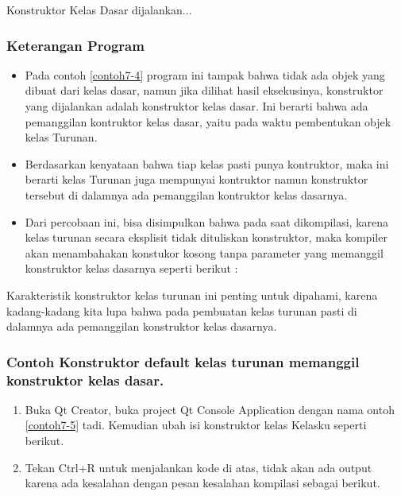 \begin{lcverbatim}
Konstruktor Kelas Dasar dijalankan...
\end{lcverbatim}


\subsubsection*{Keterangan Program}

\begin{itemize}
\item
 Pada contoh \ref{contoh7-4} program ini tampak bahwa tidak ada objek yang dibuat dari
 kelas dasar, namun jika dilihat hasil eksekusinya, konstruktor yang
 dijalankan adalah konstruktor kelas dasar. Ini berarti bahwa ada
 pemanggilan kontruktor kelas dasar, yaitu pada waktu pembentukan objek
 kelas Turunan.
\item
 Berdasarkan kenyataan bahwa tiap kelas pasti punya kontruktor, maka
 ini berarti kelas Turunan juga mempunyai kontruktor namun konstruktor
 tersebut di dalamnya ada pemanggilan kontruktor kelas dasarnya.
\item
 Dari percobaan ini, bisa disimpulkan bahwa pada saat dikompilasi,
 karena kelas turunan secara eksplisit tidak dituliskan konstruktor,
 maka kompiler akan menambahakan konstukor kosong tanpa parameter yang
 memanggil konstruktor kelas dasarnya seperti berikut :



\end{itemize}

Karakteristik konstruktor kelas turunan ini penting untuk dipahami,
karena kadang-kadang kita lupa bahwa pada pembuatan kelas turunan pasti
di dalamnya ada pemanggilan konstruktor kelas dasarnya.

\subsubsection*{Contoh Konstruktor default kelas turunan memanggil konstruktor kelas dasar.}

\begin{enumerate}

\item
 Buka Qt Creator, buka project Qt Console Application dengan nama
 ontoh \ref{contoh7-5} tadi. Kemudian ubah isi konstruktor kelas Kelasku seperti
 berikut.



\item
 Tekan Ctrl+R untuk menjalankan kode di atas, tidak akan ada output
 karena ada kesalahan dengan pesan kesalahan kompilasi sebagai berikut.
\end{enumerate}

